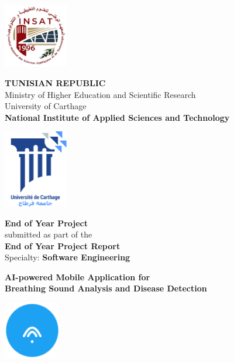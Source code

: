 \vspace*{-1.5cm} %
\begin{minipage}{0.25\textwidth}
  \includegraphics[width=2.8cm]{insat_logo.png}
\end{minipage}%
\begin{minipage}{0.5\textwidth}
  \centering
  \small\textbf{TUNISIAN REPUBLIC} \\
  \footnotesize Ministry of Higher Education and Scientific Research \\
  \footnotesize University of Carthage \\
  \small\textbf{National Institute of Applied Sciences and Technology}
\end{minipage}%
\begin{minipage}{0.25\textwidth}
  \raggedleft
  \includegraphics[width=2.8cm]{ucar_logo.png}
\end{minipage}

\vspace{0.4cm}

\begin{center}
  \large\textbf{End of Year Project} \\[0.2cm]
  \small submitted as part of the \\
  \textbf{End of Year Project Report} \\
  \small Specialty: \textbf{Software Engineering}
\end{center}

\vspace{0.4cm}

\begin{center}
  \textbf{\large AI-powered Mobile Application for\\ Breathing Sound Analysis and Disease Detection}
  
  \vspace{0.3cm}
  \includegraphics[width=2.5cm]{images/UI_Screenshots/logo_filled.png}
\end{center}

